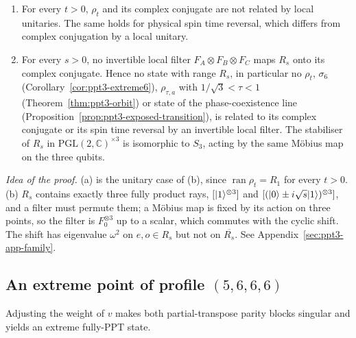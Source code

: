 \begin{corollary}\label{cor:ppt3-chirality}
\begin{enumerate}[label=(\alph*)]
\item For every $t>0$, $\rho_t$ and its complex conjugate are not related by local unitaries. The same
holds for physical spin time reversal, which differs from complex conjugation by a local unitary.
\item For every $s>0$, no invertible local filter $F_A\otimes F_B\otimes F_C$ maps $R_s$ onto its complex conjugate. Hence no state
with range $R_s$, in particular no $\rho_t$, $\sigma_6$ (Corollary~\ref{cor:ppt3-extreme6}), $\rho_{\tau,a}$ with $1/\sqrt3<\tau<1$
(Theorem~\ref{thm:ppt3-orbit}) or state of the phase-coexistence line (Proposition~\ref{prop:ppt3-exposed-transition}), is related to its complex
conjugate or its spin time reversal by an invertible local filter. The stabiliser of $R_s$ in $\mathrm{PGL}(2,\mathbb C)^{\times3}$ is
isomorphic to $S_3$, acting by the same M\"obius map on the three qubits.
\end{enumerate}
\end{corollary}
\emph{Idea of the proof.} (a) is the unitary case of (b), since $\operatorname{ran}\rho_t=R_1$ for every $t>0$. (b) $R_s$ contains exactly three fully product rays, $[\lvert1\rangle^{\otimes3}]$ and
$[(\lvert0\rangle\pm i\sqrt s\lvert1\rangle)^{\otimes3}]$, and a filter must permute them; a M\"obius map is fixed by its action on three points, so the filter is
$F_0^{\otimes3}$ up to a scalar, which commutes with the cyclic shift. The shift has eigenvalue $\omega^2$ on $e,o\in R_s$ but not on $\overline{R_s}$.
See Appendix~\ref{sec:ppt3-app-family}.

\subsection{\texorpdfstring{An extreme point of profile $(5,6,6,6)$}{An extreme point of profile (5,6,6,6)}}\label{sec:ppt3-extreme6}

Adjusting the weight of $v$ makes both partial-transpose parity blocks singular and yields an extreme fully-PPT state.

